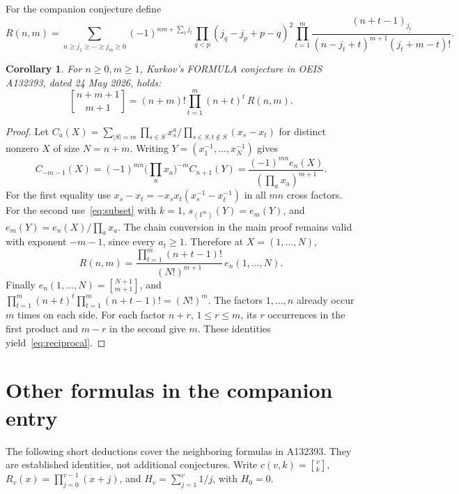 \documentclass[11pt]{article}
\newtheorem{corollary}[theorem]{Corollary}
\newcommand{\stir}[2]{\genfrac{[}{]}{0pt}{}{#1}{#2}}
\newcommand{\Schur}{s}
\begin{document}
For the companion conjecture define
\[
R(n,m)=\sum_{n\geq j_1\geq\cdots\geq j_m\geq0}
(-1)^{nm+\sum_tj_t}
\prod_{q<p}(j_q-j_p+p-q)^2
\prod_{t=1}^m\frac{(n+t-1)_{\underline{j_t}}}
{(n-j_t+t)^{m+1}(j_t+m-t)!}.
\]
\begin{corollary}\label{cor:reciprocal}
For $n\geq0,m\geq1$, Kurkov's FORMULA conjecture in OEIS A132393,
dated 24 May 2026, holds:
\begin{equation}\label{eq:reciprocal}
\stir{n+m+1}{m+1}=(n+m)!\prod_{t=1}^m(n+t)^t\,R(n,m).
\end{equation}
\end{corollary}
\begin{proof}
Let $C_a(X)=\sum_{|S|=m}\prod_{s\in S}x_s^a/
\prod_{s\in S,t\notin S}(x_s-x_t)$ for distinct nonzero $X$ of size $N=n+m$.
Writing $Y=(x_1^{-1},\ldots,x_N^{-1})$ gives
\[
C_{-m-1}(X)=(-1)^{mn}\Big(\prod_a x_a\Big)^{-m}C_{n+1}(Y)
=\frac{(-1)^{mn}e_n(X)}{(\prod_a x_a)^{m+1}}.
\]
For the first equality use
$x_s-x_t=-x_sx_t(x_s^{-1}-x_t^{-1})$ in all $mn$ cross factors.
For the second use~\eqref{eq:subset} with $k=1$,
$\Schur_{(1^m)}(Y)=e_m(Y)$, and
$e_m(Y)=e_n(X)/\prod_a x_a$.
The chain conversion in the main proof remains valid with exponent $-m-1$,
since every $a_t\geq1$. Therefore at $X=(1,\ldots,N)$,
\[
R(n,m)=\frac{\prod_{t=1}^m(n+t-1)!}{(N!)^{m+1}}\,e_n(1,\ldots,N).
\]
Finally $e_n(1,\ldots,N)=\stir{N+1}{m+1}$, and
$\prod_{t=1}^m(n+t)^t\prod_{t=1}^m(n+t-1)!=(N!)^m$.
The factors $1,\ldots,n$ already occur $m$ times on each side.
For each factor $n+r$, $1\leq r\leq m$,
its $r$ occurrences in the first product and $m-r$ in the second give $m$.
These identities yield~\eqref{eq:reciprocal}.
\end{proof}

\section{Other formulas in the companion entry}
The following short deductions cover the neighboring formulas in A132393.
They are established identities, not additional conjectures.
Write $c(v,k)=\stir vk$, $R_v(x)=\prod_{j=0}^{v-1}(x+j)$, and
$H_v=\sum_{j=1}^v1/j$, with $H_0=0$.
\end{document}
